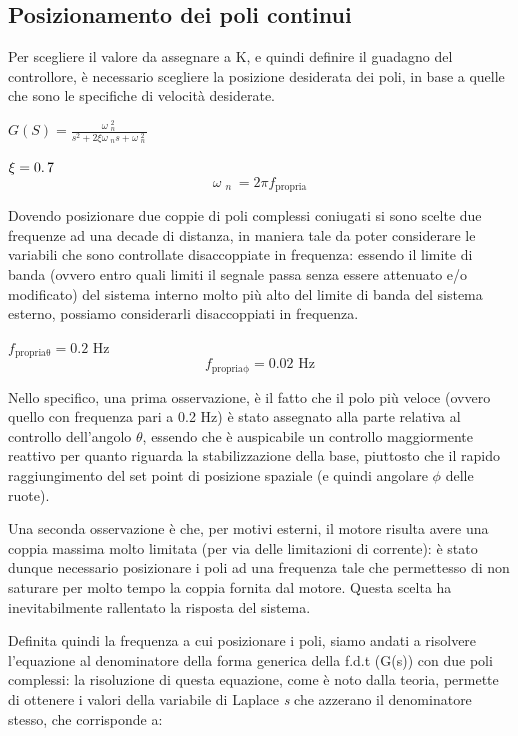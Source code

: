 \subsection{Posizionamento dei poli continui}
Per scegliere il valore da assegnare a K, e quindi definire il guadagno del controllore, è necessario scegliere la posizione desiderata dei poli, in base a quelle che sono le specifiche di velocità desiderate.

\begin{center}
	$
	G{\left(S\right)}=\frac{\omega {\;}_n^{2\;} }{s^2 +2\xi \omega {\;}_n s+\omega {\;}_n^{2\;} }
	$
\end{center}

\begin{center}
	$
	\xi =0\ldotp 7
	$
	$$
	\omega {\;}_{n\;}=2 \pi f_{\mathrm{propria}}
	$$
\end{center}

Dovendo posizionare due coppie di poli complessi coniugati si sono scelte due frequenze ad una decade di distanza, in maniera tale da poter considerare le variabili che sono controllate disaccoppiate in frequenza: essendo il limite di banda (ovvero entro quali limiti il segnale passa senza essere attenuato e/o modificato) del sistema interno molto più alto del limite di banda del sistema esterno, possiamo considerarli disaccoppiati in frequenza.

\begin{center}
	$
	f_{\mathrm{propria\theta}} =  0.2 \text{ Hz}
	$
	$$
	f_{\mathrm{propria\phi}} =  0.02 \text{ Hz}
	$$
\end{center}

Nello specifico, una prima osservazione, è il fatto che il polo più veloce (ovvero quello con frequenza pari a 0.2 Hz) è stato assegnato alla parte relativa al controllo dell'angolo $\theta$, essendo che è auspicabile un controllo maggiormente reattivo per quanto riguarda la stabilizzazione della base, piuttosto che il rapido raggiungimento del set point di posizione spaziale (e quindi angolare $\phi$ delle ruote).

Una seconda osservazione è che, per motivi esterni, il motore risulta avere una coppia massima molto limitata (per via delle limitazioni di corrente): è stato dunque necessario posizionare i poli ad una frequenza tale che permettesso di non saturare per molto tempo la coppia fornita dal motore.
Questa scelta ha inevitabilmente rallentato la risposta del sistema.

Definita quindi la frequenza a cui posizionare i poli, siamo andati a risolvere l'equazione al denominatore della forma generica della f.d.t (G(s)) con due poli complessi: la risoluzione di questa equazione, come è noto dalla teoria, permette di ottenere i valori della variabile di Laplace \textit{s} che azzerano il denominatore stesso, che corrisponde a:

